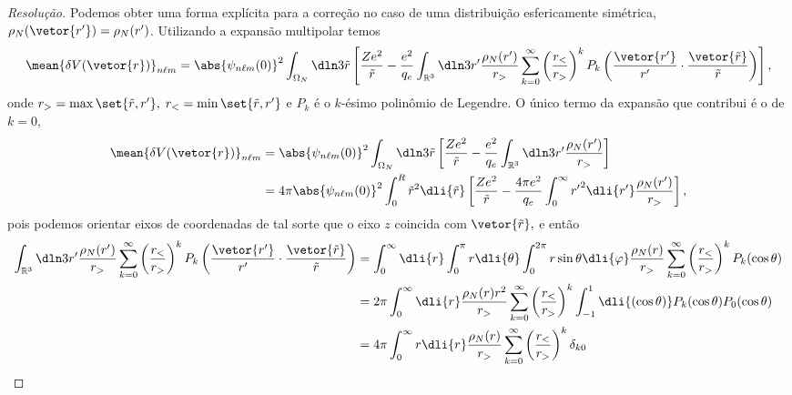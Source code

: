 \begin{proof}[Resolução]
   Podemos obter uma forma explícita para a correção no caso de uma distribuição esfericamente simétrica, \(\rho_N(\vetor{r'}) = \rho_N(r')\). Utilizando a expansão multipolar temos
   \begin{equation*}
      \mean{\delta V(\vetor{r})}_{n\ell m} = \abs{ \psi_{n\ell m}(0)}^2\int_{\Omega_N} \dln3{\tilde{r}} \left[\frac{Z e^2}{\tilde{r}} - \frac{e^2}{q_e}\int_{\mathbb{R}^3} \dln3{r'}\frac{\rho_N(r')}{r_>}\sum_{k = 0}^\infty{\left(\frac{r_<}{r_>}\right)^k P_k \left(\frac{\vetor{r'}}{r'}\cdot\frac{\vetor{\tilde{r}}}{\tilde{r}}\right)}\right],
   \end{equation*}
   onde \(r_> = \max\set{\tilde{r}, r'},\) \(r_< = \min\set{\tilde{r},r'}\) e \(P_k\) é o \(k\)-ésimo polinômio de Legendre. O único termo da expansão que contribui é o de \(k = 0,\) 
   \begin{align*}
      \mean{\delta V(\vetor{r})}_{n\ell m} &= \abs{\psi_{n \ell m}(0)}^2 \int_{\Omega_N} \dln3{\tilde{r}} \left[\frac{Z e^2}{\tilde{r}} - \frac{e^2}{q_e} \int_{\mathbb{R}^3} \dln3{r'} \frac{\rho_N(r')}{r_>}\right]\\
                                           &= 4\pi \abs{\psi_{n\ell m}(0)}^2\int_0^R \tilde{r}^2\dli{\tilde{r}} \left[\frac{Z e^2}{\tilde{r}} - \frac{4\pi e^2}{q_e} \int_0^\infty {r'}^2 \dli{r'}\frac{\rho_N(r')}{r_>}\right],
   \end{align*}
   pois podemos orientar eixos de coordenadas de tal sorte que o eixo \(z\) coincida com \(\vetor{\tilde{r}},\) e então
   \begin{align*}
      \int_{\mathbb{R}^3} \dln3{r'} \frac{\rho_N(r')}{r_>} \sum_{k = 0}^\infty \left(\frac{r_<}{r_>}\right)^k P_k\left(\frac{\vetor{r'}}{r'}\cdot \frac{\vetor{\tilde{r}}}{\tilde{r}}\right)
      &= \int_0^\infty \dli{r} \int_0^{\pi} r\dli{\theta} \int_0^{2\pi} r\sin\theta \dli{\varphi} \frac{\rho_N(r)}{r_>}\sum_{k = 0}^\infty\left(\frac{r_<}{r_>}\right)^k P_k(\cos\theta)\\
      &= 2\pi \int_0^\infty \dli{r} \frac{\rho_N(r) {r}^2}{r_>}\sum_{k = 0}^\infty\left(\frac{r_<}{r_>}\right)^k\int_{-1}^{1} \dli{(\cos\theta)} P_k(\cos\theta) P_0(\cos\theta)\\
      &= 4\pi \int_0^\infty r\dli{r} \frac{\rho_N(r)}{r_>} \sum_{k=0}^\infty \left(\frac{r_<}{r_>}\right)^k \delta_{k0}\\

\end{align*}
\end{proof}
